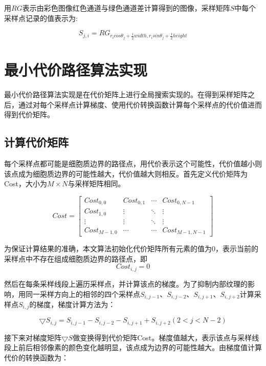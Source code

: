 \documentclass[nomlist,masters]{seuthesix}
\begin{document}
用$RG$表示由彩色图像红色通道与绿色通道差计算得到的图像，采样矩阵$S$中每个采样点记录的值表示为:

\begin{equation}
S_{j,i}=RG_{r_{i}cos\theta _{j}+\frac{1}{2}width,r_{i}sin\theta _{j}+\frac{1}{2}height}
\label{PtoI}
\end{equation}

\section{最小代价路径算法实现}

最小代价路径算法实现是在代价矩阵上进行全局搜索实现的。在得到采样矩阵之后，通过对每个采样点计算梯度、使用代价转换函数计算每个采样点的代价值进而得到代价矩阵。

\subsection{计算代价矩阵}
每个采样点都可能是细胞质边界的路径点，用代价表示这个可能性，代价值越小则该点成为细胞质边界的可能性越大，代价值越大则相反。首先定义代价矩阵为Cost，大小为$M\times N$与采样矩阵相同。

\begin{equation}
Cost=\begin{bmatrix}
Cost_{0,0} & Cost_{0,1} &  \cdots & Cost_{0,N-1}\\ 
Cost_{1,0} &  \vdots &  \ddots & \vdots\\ 
 \vdots &  \vdots &  \ddots & \vdots \\ 
Cost_{M-1,0} &  \cdots &  \cdots & Cost_{M-1,N-1}
\end{bmatrix}
\label{COST}
\end{equation}

为保证计算结果的准确，本文算法初始化代价矩阵所有元素的值为0，表示当前的采样点中不存在组成细胞质边界的路径点，即
\begin{equation}
Cost_{i,j}=0
\label{cost0}
\end{equation}

然后在每条采样线段上遍历采样点，并计算该点的梯度。为了抑制内部纹理的影响，用同一采样方向上的相邻的四个采样点$S_{i,j-1}$、$S_{i,j-2}$、$S_{i,j+1}$、$S_{i,j+2}$计算采样点$S_{i,j}$的梯度，梯度计算方法为：

\begin{equation}
\bigtriangledown S_{i,j}=S_{i,j-1}-S_{i,j-2}-S_{i,j+1}+S_{i,j+2}(2<j<N-2)
\label{gradient}
\end{equation}

接下来对梯度矩阵$\bigtriangledown S$做变换得到代价矩阵Cost。梯度值越大，表示该点与采样线段上前后相邻像素的颜色变化越明显，该点成为边界的可能性越大。由梯度值计算代价的转换函数为：
\end{document}
